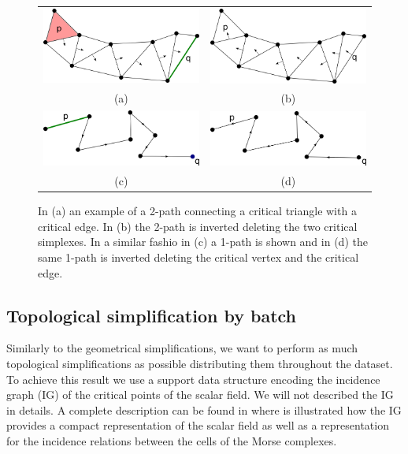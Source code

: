 \documentclass[preprint,5p,times,onecolumn]{article}
\begin{document}
\begin{figure}
	\begin{tabular}{c c}
		\includegraphics[width=0.45\linewidth]{images/twopath-critical} &
		\includegraphics[width=0.45\linewidth]{images/twopath} \\
		(a) & (b) \\
		\includegraphics[width=0.45\linewidth]{images/onepath-critical} &
		\includegraphics[width=0.45\linewidth]{images/onepath} \\
		(c) & (d) \\
	\end{tabular}
	\label{fig:grad_simpl}
	\caption{In (a) an example of a 2-path connecting a critical triangle with a critical edge. In (b) the 2-path is inverted deleting the two critical simplexes. In a similar fashio in (c) a 1-path is shown and in (d) the same 1-path is inverted deleting the critical vertex and the critical edge.}
\end{figure}


\subsection{Topological simplification by batch}
Similarly to the geometrical simplifications, we want to perform as much topological simplifications as possible distributing them throughout the dataset. To achieve this result we use a support data structure encoding the incidence graph (IG) of the critical points of the scalar field. We will not described the IG in details. A complete description can be found in \cite{Comi13} where is illustrated how the IG provides a compact representation of the scalar field as well as a representation for the incidence relations between the cells of the Morse complexes.
\end{document}
